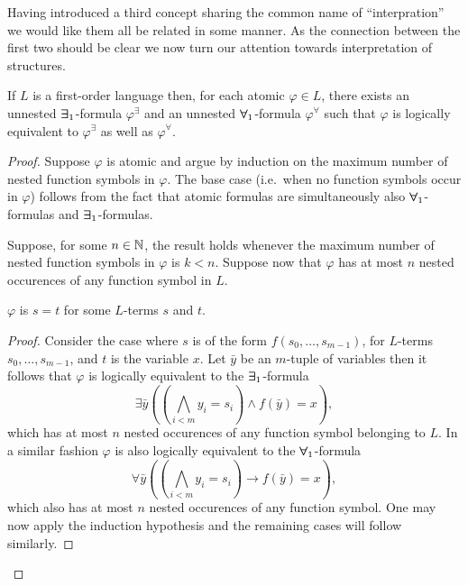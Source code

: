 Having introduced a third concept sharing the common name of ``interpration'' we would like them all be related in some manner.  As the connection between the first two should be clear we now turn our attention towards interpretation of structures.

\begin{prp}
	If $L$ is a first-order language then, for each atomic $\varphi\in L$, there exists an unnested $\bm{\exists}_{1}$-formula $\varphi^\exists$ and an unnested $\bm{\forall}_{1}$-formula $\varphi^\forall$ such that $\varphi$ is logically equivalent to $\varphi^\exists$ as well as $\varphi^\forall$.
\end{prp}
\begin{proof}
	Suppose $\varphi$ is atomic and argue by induction on the maximum number of nested function symbols in $\varphi$.  The base case (i.e.\ when no function symbols occur in $\varphi$) follows from the fact that atomic formulas are simultaneously also $\bm{\forall}_{1}$-formulas and $\bm{\exists}_{1}$-formulas.

	Suppose, for some $n\in\mathbb{N}$, the result holds whenever the maximum number of nested function symbols in $\varphi$ is $k<n$.  Suppose now that $\varphi$ has at most $n$ nested occurences of any function symbol in $L$.
	\begin{case}
		$\varphi$ is $s=t$ for some $L$-terms $s$ and $t$.
	\end{case}
	\begin{proof}
		Consider the case where $s$ is of the form $f(s_0,\dotsc,s_{m-1})$, for $L$-terms $s_0,\dotsc,s_{m-1}$, and $t$ is the variable $x$.  Let $\bar{y}$ be an $m$-tuple of variables then it follows that $\varphi$ is logically equivalent to the $\bm{\exists}_{1}$-formula
		\begin{equation}
			\exists\bar{y}\left(\left(\bigwedge_{i<m}y_i=s_i\right)\wedge f(\bar{y})=x\right),
		\end{equation}
		which has at most $n$ nested occurences of any function symbol belonging to $L$.  In a similar fashion $\varphi$ is also logically equivalent to the $\bm{\forall}_{1}$-formula
		\begin{equation}
			\forall\bar{y}\left(\left(\bigwedge_{i<m}y_i=s_i\right)\rightarrow f(\bar{y})=x\right),
		\end{equation}
		which also has at most $n$ nested occurences of any function symbol.  One may now apply the induction hypothesis and the remaining cases will follow similarly.
	\end{proof}


\end{proof}
